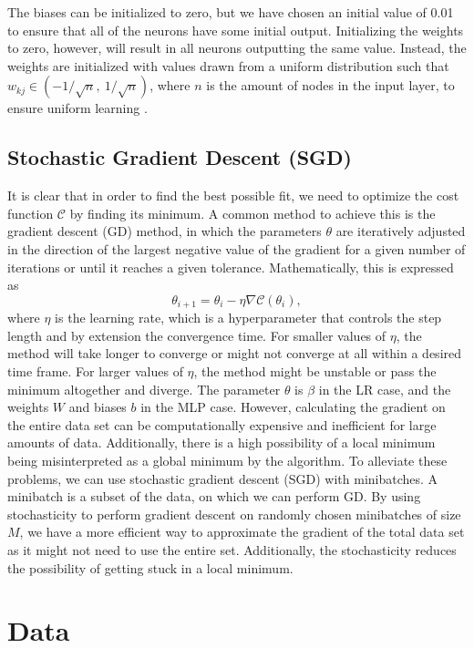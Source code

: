 \documentclass[a4paper, 11pt, twocolumn]{article}
\begin{document}
The biases can be initialized to zero, but we have chosen an initial value of 0.01 to ensure that all of the neurons have some initial output. Initializing the weights to zero, however, will result in all neurons outputting the same value. Instead, the  weights are initialized with values drawn from a uniform distribution such that $w_{kj}\in (-1/\sqrt{n}, \ 1/\sqrt{n})$, where $n$ is the amount of nodes in the input layer,  to ensure uniform learning \cite{ML_algo}. 

\subsection{Stochastic Gradient Descent (SGD)}
It is clear that in order to find the best possible fit, we need to optimize the cost function $\mathcal{C}$ by finding its minimum. A common method to achieve this is the gradient descent (GD) method, in which the parameters $\theta$ are iteratively adjusted in the direction of the largest negative value of the gradient for a given number of iterations or until it reaches a given tolerance. Mathematically, this is expressed as
\begin{equation}
\theta_{i+1} = \theta_i -\eta \nabla \mathcal{C}(\theta_i),
\end{equation}
where $\eta$ is the learning rate, which is a hyperparameter that controls the step length and by extension the convergence time. For smaller values of $\eta$, the method will take longer to converge or might not converge at all within a desired time frame. For larger values of $\eta$, the method might be unstable or pass the minimum altogether and diverge. The parameter $\theta$ is $\beta$ in the LR case, and the weights $W$ and biases $b$ in the MLP case.  
However, calculating the gradient on the entire data set can be computationally expensive and inefficient for large amounts of data. Additionally, there is a high possibility of a local minimum being misinterpreted as a global minimum by the algorithm. 
To alleviate these problems, we can use stochastic gradient descent (SGD) with minibatches.  A minibatch is a subset of the data, on which we can perform GD. By using stochasticity to perform gradient descent on randomly chosen minibatches of size $M$, we have a more efficient way to approximate the gradient of the total data set as it might not need to use the entire set. Additionally, the stochasticity reduces the possibility of getting stuck in a local minimum.

\section{Data}
\end{document}
